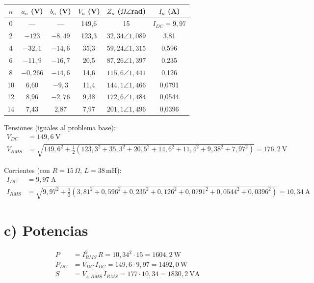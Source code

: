 \documentclass[11pt]{article}
\begin{document}
\begin{center}
\begin{tabular}{c c c c c c}
$n$ & $a_n$ (V) & $b_n$ (V) & $V_n$ (V) & $Z_n$ ($\Omega\angle$rad) & $I_n$ (A) \\ \hline
0 & --- & --- & 149{,}6 & 15 & $I_{DC}=9{,}97$ \\
2 & $-123$ & $-8{,}49$ & 123{,}3 & $32{,}34\angle1{,}089$ & 3{,}81 \\
4 & $-32{,}1$ & $-14{,}6$ & 35{,}3 & $59{,}24\angle1{,}315$ & 0{,}596 \\
6 & $-11{,}9$ & $-16{,}7$ & 20{,}5 & $87{,}26\angle1{,}397$ & 0{,}235 \\
8 & $-0{,}266$ & $-14{,}6$ & 14{,}6 & $115{,}6\angle1{,}441$ & 0{,}126 \\
10 & 6{,}60 & $-9{,}3$ & 11{,}4 & $144{,}1\angle1{,}466$ & 0{,}0791 \\
12 & 8{,}96 & $-2{,}76$ & 9{,}38 & $172{,}6\angle1{,}484$ & 0{,}0544 \\
14 & 7{,}43 & 2{,}87 & 7{,}97 & $201{,}1\angle1{,}496$ & 0{,}0396 \\
\end{tabular}
\end{center}

Tensiones (iguales al problema base):
\begin{align*}
V_{DC} &= 149{,}6\ \text{V} \\
V_{RMS} &= \sqrt{149{,}6^2 + \tfrac{1}{2}\left(123{,}3^2+35{,}3^2+20{,}5^2+14{,}6^2+11{,}4^2+9{,}38^2+7{,}97^2\right)} = 176{,}2\ \text{V}
\end{align*}

Corrientes (con $R=15\,\Omega$, $L=38$\,mH):
\begin{align*}
I_{DC} &= 9{,}97\ \text{A} \\
I_{RMS} &= \sqrt{9{,}97^2 + \tfrac{1}{2}\left(3{,}81^2+0{,}596^2+0{,}235^2+0{,}126^2+0{,}0791^2+0{,}0544^2+0{,}0396^2\right)} = 10{,}34\ \text{A}
\end{align*}

\section*{c) Potencias}

\begin{align*}
P &= I_{RMS}^2\,R = 10{,}34^2 \cdot 15 = 1604{,}2\ \text{W} \\
P_{DC} &= V_{DC}\,I_{DC} = 149{,}6 \cdot 9{,}97 = 1492{,}0\ \text{W} \\
S &= V_{s,RMS}\,I_{RMS} = 177 \cdot 10{,}34 = 1830{,}2\ \text{VA}
\end{align*}
\end{document}

